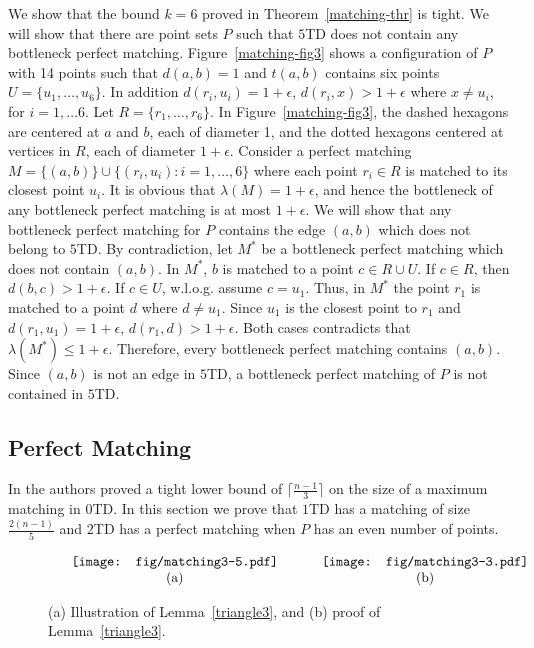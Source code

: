 \documentclass[11pt,a4paper]{article}
\newcommand{\kTD}[2]{$#1$\text{-}TD#2}
\begin{document}
We show that the bound $k=6$ proved in Theorem~\ref{matching-thr} is tight. We will show that there are point sets $P$ such that \kTD{5}{} does not contain any bottleneck perfect matching.
Figure~\ref{matching-fig3} shows a configuration of $P$ with 14 points such that $d(a,b)=1$ and $t(a,b)$ contains six points $U=\{u_1, \dots, u_6\}$. In addition $d(r_i, u_i)= 1+\epsilon$, $d(r_i,x)>1+\epsilon$ where $x\neq u_i$, for $i=1,\dots 6$. Let $R=\{r_1,\dots, r_6\}$. In Figure~\ref{matching-fig3}, the dashed hexagons are centered at $a$ and $b$, each of diameter 1, and the dotted hexagons centered at vertices in $R$, each of diameter $1+\epsilon$. Consider a perfect matching $M=\{(a,b)\}\cup \{(r_i, u_i): i=1,\dots, 6\}$ where each point $r_i\in R$ is matched to its closest point $u_i$. It is obvious that $\lambda(M)=1+\epsilon$, and hence the bottleneck of any bottleneck perfect matching is at most $1+\epsilon$. We will show that any bottleneck perfect matching for $P$ contains the edge $(a,b)$ which does not belong to \kTD{5}{}. By contradiction, let $M^*$ be a bottleneck perfect matching which does not contain $(a,b)$. In $M^*$, $b$ is matched to a point $c\in R\cup U$. If $c \in R$, then $d(b,c)>1+\epsilon$. If $c\in U$, w.l.o.g. assume $c = u_1$. Thus, in $M^*$ the point $r_1$ is matched to a point $d$ where $d\neq u_1$. Since $u_1$ is the closest point to $r_1$ and $d(r_1,u_1)=1+\epsilon$, $d(r_1,d)>1+\epsilon$. Both cases contradicts that $\lambda(M^*)\le 1+\epsilon$. Therefore, every bottleneck perfect matching contains $(a,b)$. Since $(a,b)$ is not an edge in \kTD{5}{}, a bottleneck perfect matching of $P$ is not contained in \kTD{5}{}.  

\subsection{Perfect Matching}
\label{matching2}
In \cite{Babu2013} the authors proved a tight lower bound of $\lceil\frac{n-1}{3}\rceil$ on the size of a maximum matching in \kTD{0}{}. In this section we prove that \kTD{1}{} has a matching of size $\frac{2(n-1)}{5}$ and \kTD{2}{} has a perfect matching when $P$ has an even number of points.

\begin{figure}[htb]
  \centering
\setlength{\tabcolsep}{0in}
  $\begin{tabular}{cc}
 \multicolumn{1}{m{.5\columnwidth}}{\centering\texttt{[image: fig/matching3-5.pdf]}}
&\multicolumn{1}{m{.5\columnwidth}}{\centering\texttt{[image: fig/matching3-3.pdf]}}\\
(a) & (b)
\end{tabular}$
  \caption{(a) Illustration of Lemma~\ref{triangle3}, and (b) proof of Lemma~\ref{triangle3}.}
\label{intersection-fig}
\end{figure}
\end{document}
